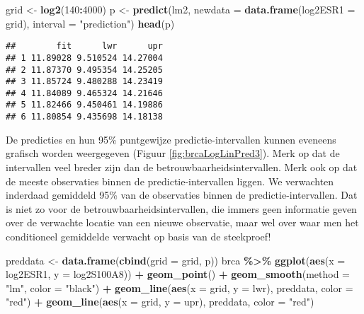 \documentclass[
  12pt,dutch,coursenotes]{book}
\newenvironment{Shaded}{\begin{snugshade}}{\end{snugshade}}
\newcommand{\DataTypeTok}[1]{\textcolor[rgb]{0.13,0.29,0.53}{#1}}
\newcommand{\DecValTok}[1]{\textcolor[rgb]{0.00,0.00,0.81}{#1}}
\newcommand{\KeywordTok}[1]{\textcolor[rgb]{0.13,0.29,0.53}{\textbf{#1}}}
\newcommand{\NormalTok}[1]{#1}
\newcommand{\OperatorTok}[1]{\textcolor[rgb]{0.81,0.36,0.00}{\textbf{#1}}}
\newcommand{\StringTok}[1]{\textcolor[rgb]{0.31,0.60,0.02}{#1}}
\theoremstyle{definition}
\theoremstyle{definition}
\theoremstyle{definition}
\theoremstyle{remark}
\begin{document}
\begin{Shaded}
\begin{Highlighting}[]
\NormalTok{grid \textless{}{-}}\StringTok{ }\KeywordTok{log2}\NormalTok{(}\DecValTok{140}\OperatorTok{:}\DecValTok{4000}\NormalTok{)}
\NormalTok{p \textless{}{-}}\StringTok{ }\KeywordTok{predict}\NormalTok{(lm2, }\DataTypeTok{newdata =} \KeywordTok{data.frame}\NormalTok{(}\DataTypeTok{log2ESR1 =}\NormalTok{ grid), }
    \DataTypeTok{interval =} \StringTok{"prediction"}\NormalTok{)}
\KeywordTok{head}\NormalTok{(p)}
\end{Highlighting}
\end{Shaded}

\begin{verbatim}
##        fit      lwr      upr
## 1 11.89028 9.510524 14.27004
## 2 11.87370 9.495354 14.25205
## 3 11.85724 9.480288 14.23419
## 4 11.84089 9.465324 14.21646
## 5 11.82466 9.450461 14.19886
## 6 11.80854 9.435698 14.18138
\end{verbatim}

De predicties en hun 95\% puntgewijze predictie-intervallen kunnen eveneens grafisch worden weergegeven (Figuur \ref{fig:brcaLogLinPred3}).
Merk op dat de intervallen veel breder zijn dan de betrouwbaarheidsintervallen.
Merk ook op dat de meeste observaties binnen de predictie-intervallen liggen.
We verwachten inderdaad gemiddeld 95\% van de observaties binnen de predictie-intervallen.
Dat is niet zo voor de betrouwbaarheidsintervallen, die immers geen informatie geven over de verwachte locatie van een nieuwe observatie, maar wel over waar men het conditioneel gemiddelde verwacht op basis van de steekproef!

\begin{Shaded}
\begin{Highlighting}[]
\NormalTok{preddata \textless{}{-}}\StringTok{ }\KeywordTok{data.frame}\NormalTok{(}\KeywordTok{cbind}\NormalTok{(}\DataTypeTok{grid =}\NormalTok{ grid, p))}
\NormalTok{brca }\OperatorTok{\%\textgreater{}\%}\StringTok{ }\KeywordTok{ggplot}\NormalTok{(}\KeywordTok{aes}\NormalTok{(}\DataTypeTok{x =}\NormalTok{ log2ESR1, }\DataTypeTok{y =}\NormalTok{ log2S100A8)) }\OperatorTok{+}\StringTok{ }
\StringTok{    }\KeywordTok{geom\_point}\NormalTok{() }\OperatorTok{+}\StringTok{ }\KeywordTok{geom\_smooth}\NormalTok{(}\DataTypeTok{method =} \StringTok{"lm"}\NormalTok{, }\DataTypeTok{color =} \StringTok{"black"}\NormalTok{) }\OperatorTok{+}\StringTok{ }
\StringTok{    }\KeywordTok{geom\_line}\NormalTok{(}\KeywordTok{aes}\NormalTok{(}\DataTypeTok{x =}\NormalTok{ grid, }\DataTypeTok{y =}\NormalTok{ lwr), preddata, }\DataTypeTok{color =} \StringTok{"red"}\NormalTok{) }\OperatorTok{+}\StringTok{ }
\StringTok{    }\KeywordTok{geom\_line}\NormalTok{(}\KeywordTok{aes}\NormalTok{(}\DataTypeTok{x =}\NormalTok{ grid, }\DataTypeTok{y =}\NormalTok{ upr), preddata, }\DataTypeTok{color =} \StringTok{"red"}\NormalTok{)}
\end{Highlighting}
\end{Shaded}
\end{document}

